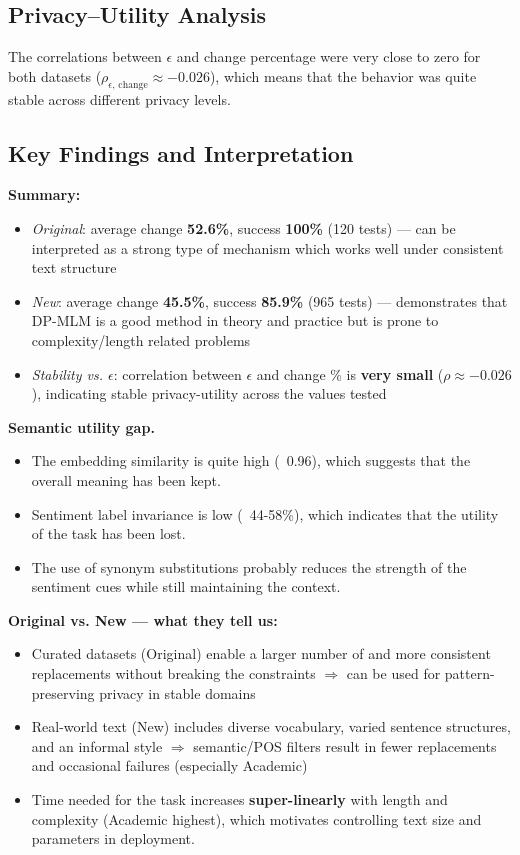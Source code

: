 \documentclass[11pt]{article}
\begin{document}
\subsection{Privacy--Utility Analysis}
The correlations between $\epsilon$ and change percentage were very close to zero for both datasets ($\rho_{\epsilon,\,\text{change}} \approx -0.026$), which means that the behavior was quite stable across different privacy levels.

\subsection{Key Findings and Interpretation}
\textbf{Summary:}
\begin{itemize}[leftmargin=*]
  \item \textit{Original}: average change \textbf{52.6\%}, success \textbf{100\%} (120 tests) — can be interpreted as a strong type of mechanism which works well under consistent text structure
  \item \textit{New}: average change \textbf{45.5\%}, success \textbf{85.9\%} (965 tests) — demonstrates that DP-MLM is a good method in theory and practice but is prone to complexity/length related problems
  \item \textit{Stability vs. $\epsilon$}: correlation between $\epsilon$ and change \% is \textbf{very small} ($\rho \approx -0.026$), indicating stable privacy-utility across the values tested
\end{itemize}

\textbf{Semantic utility gap.}
\begin{itemize}[leftmargin=*]
 \item The embedding similarity is quite high (~0.96), which suggests that the overall meaning has been kept.
 \item Sentiment label invariance is low (~44-58\%), which indicates that the utility of the task has been lost.
 \item The use of synonym substitutions probably reduces the strength of the sentiment cues while still maintaining the context.
\end{itemize}

\textbf{Original vs. New — what they tell us:}
\begin{itemize}[leftmargin=*]
  \item Curated datasets (Original) enable a larger number of and more consistent replacements without breaking the constraints $\Rightarrow$ can be used for pattern-preserving privacy in stable domains
  \item Real-world text (New) includes diverse vocabulary, varied sentence structures, and an informal style $\Rightarrow$ semantic/POS filters result in fewer replacements and occasional failures (especially Academic)
  \item Time needed for the task increases \textbf{super-linearly} with length and complexity (Academic highest), which motivates controlling text size and parameters in deployment.
\end{itemize}
\end{document}
